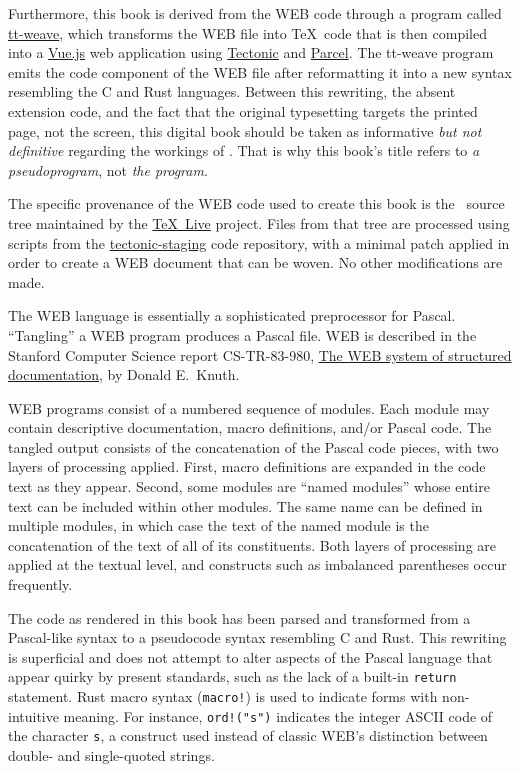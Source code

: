Furthermore, this book is derived from the WEB code through a program called
\href{https://github.com/tectonic-typesetting/tt-weave/}{tt-weave}, which
transforms the WEB file into \TeX\ code that is then compiled into a
\href{https://vuejs.org}{Vue.js} web application using
\href{https://tectonic-typesetting.github.io/}{Tectonic} and
\href{https://parceljs.org/}{Parcel}. The tt-weave program emits the code
component of the WEB file after reformatting it into a new syntax resembling the
C and Rust languages. Between this rewriting, the absent extension code, and the
fact that the original typesetting targets the printed page, not the screen,
this digital book should be taken as informative \textit{but not definitive}
regarding the workings of \XeTeX. That is why this book's title refers to
\textit{a pseudoprogram}, not \textit{the program}.

The specific provenance of the WEB code used to create this book is the \XeTeX\
source tree maintained by the \href{https://www.tug.org/texlive/}{\TeX\ Live}
project. Files from that tree are processed using scripts from the
\href{https://github.com/tectonic-typesetting/tectonic-staging/}{\textsf{tectonic-staging}}
code repository, with a minimal patch applied in order to create a WEB document
that can be woven. No other modifications are made.


The WEB language is essentially a sophisticated preprocessor for Pascal.
“Tangling” a WEB program produces a Pascal file. WEB is described in the
Stanford Computer Science report CS-TR-83-980,
\href{http://i.stanford.edu/TR/CS-TR-83-980.html}{The WEB system of structured
documentation}, by Donald E.\ Knuth.

WEB programs consist of a numbered sequence of modules. Each module may contain
descriptive documentation, macro definitions, and/or Pascal code. The tangled
output consists of the concatenation of the Pascal code pieces, with two layers
of processing applied. First, macro definitions are expanded in the code text as
they appear. Second, some modules are “named modules” whose entire text can be
included within other modules. The same name can be defined in multiple modules,
in which case the text of the named module is the concatenation of the text of
all of its constituents. Both layers of processing are applied at the textual
level, and constructs such as imbalanced parentheses occur frequently.

The code as rendered in this book has been parsed and transformed from a
Pascal-like syntax to a pseudocode syntax resembling C and Rust. This rewriting
is superficial and does not attempt to alter aspects of the Pascal language that
appear quirky by present standards, such as the lack of a built-in
\texttt{return} statement. Rust macro syntax (\texttt{macro!}) is used to
indicate forms with non-intuitive meaning. For instance, \texttt{ord!("s")}
indicates the integer ASCII code of the character \texttt{s}, a construct used
instead of classic WEB's distinction between double- and single-quoted strings.

